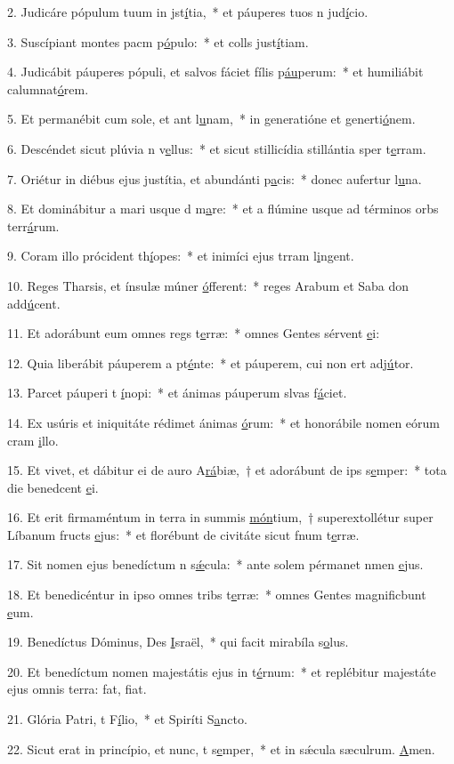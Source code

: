 2. Judicáre pópulum tuum in jst\uline{í}tia,~* et páuperes tuos n jud\uline{í}cio.\par 
3. Suscípiant montes pacm p\uline{ó}pulo:~* et colls just\uline{í}tiam.\par 
4. Judicábit páuperes pópuli, et salvos fáciet fílis p\uline{áu}perum:~* et humiliábit calumnat\uline{ó}rem.\par 
5. Et permanébit cum sole, et ant l\uline{u}nam,~* in generatióne et generti\uline{ó}nem.\par 
6. Descéndet sicut plúvia n v\uline{e}llus:~* et sicut stillicídia stillántia sper t\uline{e}rram.\par 
7. Oriétur in diébus ejus justítia, et abundánti p\uline{a}cis:~* donec aufertur l\uline{u}na.\par 
8. Et dominábitur a mari usque d m\uline{a}re:~* et a flúmine usque ad términos orbs terr\uline{á}rum.\par 
9. Coram illo prócident th\uline{í}opes:~* et inimíci ejus trram l\uline{i}ngent.\par 
10. Reges Tharsis, et ínsulæ múner \uline{ó}fferent:~* reges Arabum et Saba don add\uline{ú}cent.\par 
11. Et adorábunt eum omnes regs t\uline{e}rræ:~* omnes Gentes sérvent \uline{e}i:\par 
12. Quia liberábit páuperem a pt\uline{é}nte:~* et páuperem, cui non ert adj\uline{ú}tor.\par 
13. Parcet páuperi t \uline{í}nopi:~* et ánimas páuperum slvas f\uline{á}ciet.\par 
14. Ex usúris et iniquitáte rédimet ánimas \uline{ó}rum:~* et honorábile nomen eórum cram \uline{i}llo.\par 
15. Et vivet, et dábitur ei de auro A\uline{rá}biæ,~† et adorábunt de ips s\uline{e}mper:~* tota die benedcent \uline{e}i.\par 
16. Et erit firmaméntum in terra in summis \uline{món}tium,~† superextollétur super Líbanum fructs \uline{e}jus:~* et florébunt de civitáte sicut fnum t\uline{e}rræ.\par 
17. Sit nomen ejus benedíctum n s\uline{ǽ}cula:~* ante solem pérmanet nmen \uline{e}jus.\par 
18. Et benedicéntur in ipso omnes tribs t\uline{e}rræ:~* omnes Gentes magnificbunt \uline{e}um.\par 
19. Benedíctus Dóminus, Des \uline{I}sraël,~* qui facit mirabíla s\uline{o}lus.\par 
20. Et benedíctum nomen majestátis ejus in t\uline{é}rnum:~* et replébitur majestáte ejus omnis terra: fat, f\uline{i}at.\par 
21. Glória Patri, t F\uline{í}lio,~* et Spiríti S\uline{a}ncto.\par 
22. Sicut erat in princípio, et nunc, t s\uline{e}mper,~* et in sǽcula sæculrum. \uline{A}men.\par 
